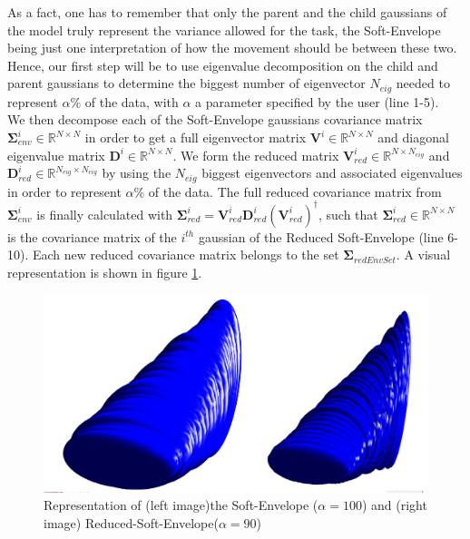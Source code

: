 \documentclass[letterpaper, 10 pt, conference]{ieeeconf}  %
\newcommand{\mb}[1]{{\boldsymbol{#1}}}
\newcommand{\psin}{{\!\dagger}}
\begin{document}
As a fact, one has to remember that only the parent and the child gaussians of the model truly represent the variance allowed for the task, the Soft-Envelope being just one interpretation of how the movement should be between these two. Hence, our first step will be to use eigenvalue decomposition on the child and parent gaussians to determine the biggest number of eigenvector $N_{eig}$ needed to represent $\alpha \%$ of the data, with $\alpha$ a parameter specified by the user (line 1-5). \\
We then decompose each of the Soft-Envelope gaussians covariance matrix $\mb{\Sigma}_{env}^i \in \mathbb{R}^{N \times N}$  in order to get a full eigenvector matrix $\mb{V}^{i} \in \mathbb{R}^{N \times N}$ and diagonal eigenvalue matrix $\mb{D}^{i} \in \mathbb{R}^{N \times N}$. We form the reduced  matrix $\mb{V}_{red}^{i}\in \mathbb{R}^{N \times N_{eig}}$ and $\mb{D}_{red}^{i} \in \mathbb{R}^{N_{eig} \times N_{eig}}$  by using the $N_{eig}$ biggest eigenvectors and associated eigenvalues in order to represent $\alpha \%$ of the data.
The full reduced covariance matrix from $\mb{\Sigma}_{env}^{i}$ is finally calculated with $\mb{\Sigma}_{red}^{i} =\mb{V}_{red}^{i} \mb{D}_{red}^{i}  (\mb{V}_{red}^{i})^{\psin}$, such that $\mb{\Sigma}_{red}^{i}  \in \mathbb{R}^{N \times N} $  is the covariance matrix of the $i^{th}$ gaussian of the Reduced Soft-Envelope (line 6-10). Each new reduced covariance matrix belongs to the set $\mb{\Sigma}_{redEnvSet}$. A visual representation is shown in figure \ref{100vs90EnvOnly}.
\begin{figure}[h]
	\centering
	\includegraphics[scale=0.21]{figure/100vs90EnvOnly.png}
	\caption{Representation of (left image)the Soft-Envelope ($\alpha = 100$) and (right image) Reduced-Soft-Envelope($\alpha = 90$)}
	\label{100vs90EnvOnly}
\end{figure}
\end{document}
